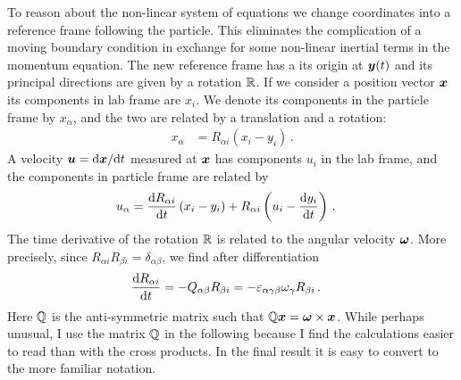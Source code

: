 \documentclass[thesis.tex]{subfiles}
\begin{document}
To reason about the non-linear system of equations we change coordinates into a reference frame following the particle. This eliminates the complication of a moving boundary condition in exchange for some non-linear inertial terms in the momentum equation. The new reference frame has a its origin at $\mbox{\boldmath$y$}(t)$ and its principal directions are given by a rotation $\mathbb{R}$.
If we consider a position vector $\mbox{\boldmath$x$}$ its components in lab frame are $x_i$. We denote its components in the particle frame by $x_\alpha$, and the two are related by a translation and a rotation:
\begin{align}
    x_\alpha &= R_{\alpha i}\left(x_i - y_i\right)\,.
\end{align}
A velocity $\mbox{\boldmath$u$} = \mathrm{d} \mbox{\boldmath$x$}/\mathrm{d} t$ measured at $\mbox{\boldmath$x$}$ has components $u_i$ in the lab frame, and the components in particle frame are related by
\begin{align}
    u_\alpha &= \frac{\mathrm{d} R_{\alpha i}}{\mathrm{d} t}\left(x_i - y_i\right) + R_{\alpha i}\left(u_i - \frac{\mathrm{d} y_i}{\mathrm{d} t}\right)\,.
\end{align}
The time derivative of the rotation $\mathbb{R}$ is related to the angular velocity $\mbox{\boldmath$\omega$}$. More precisely, since $R_{\alpha i}R_{\beta i} = \delta_{\alpha\beta}$, we find after differentiation
\begin{align}
    \frac{\mathrm{d} R_{\alpha i}}{\mathrm{d} t} &= -Q_{\alpha \beta} R_{\beta i} = -\varepsilon_{\alpha\gamma\beta}\omega_\gamma R_{\beta i}\,.
\end{align}
Here $\mathbb{Q}$ is the anti-symmetric matrix such that $\mathbb{Q}\mbox{\boldmath$x$} = \mbox{\boldmath$\omega$} \times \mbox{\boldmath$x$}$. While perhaps unusual, I use the matrix $\mathbb{Q}$ in the following because I find the calculations easier to read than with the cross products. In the final result it is easy to convert to the more familiar notation.
\end{document}
